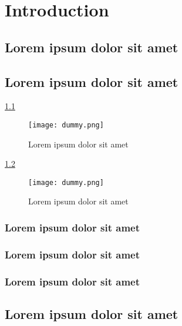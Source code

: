 \chapter{Introduction}

\section{Lorem ipsum dolor sit amet}

\lipsum[1-3]

\section{Lorem ipsum dolor sit amet}

\lipsum[1-1] \ref{fig:figA-1}

\begin{figure}[H]
    \centering
    \texttt{[image: dummy.png]}
    \caption{Lorem ipsum dolor sit amet}
    \label{fig:figA-1}
\end{figure}

\lipsum[1-1] \ref{fig:figB-1}

\begin{figure}[H]
    \centering
    \texttt{[image: dummy.png]}
    \caption{Lorem ipsum dolor sit amet}
    \label{fig:figB-1}
\end{figure}

\subsection{Lorem ipsum dolor sit amet}

\lipsum[1-1] \cite{reference-1}

\subsection{Lorem ipsum dolor sit amet}

\lipsum[1-1] \cite{reference-2}

\subsection{Lorem ipsum dolor sit amet}

\lipsum[1-1] \cite{reference-3}

\section{Lorem ipsum dolor sit amet}

